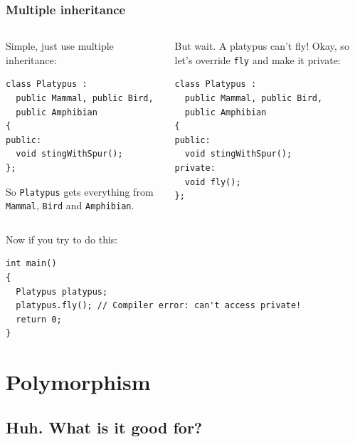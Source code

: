 \documentclass{beamer}
\begin{document}
\begin{frame}[fragile]
  \frametitle{Multiple inheritance}
  
  \begin{columns}[t]
    \begin{column}[T]{0.49\linewidth}
  		Simple, just use multiple inheritance:
  		\begin{lstlisting}
class Platypus :
  public Mammal, public Bird,
  public Amphibian
{
public:
  void stingWithSpur();
};
  		\end{lstlisting}
  		So \texttt{Platypus} gets everything from \texttt{Mammal}, \texttt{Bird} and \texttt{Amphibian}.
  	\end{column}
  	\pause
  	\begin{column}[T]{0.49\linewidth}
	  	But wait.  A platypus can't fly! \pause{}  Okay, so let's override \texttt{fly} and make it private:
		  \begin{lstlisting}
class Platypus :
  public Mammal, public Bird,
  public Amphibian
{
public:
  void stingWithSpur();
private:
  void fly();
};
  		\end{lstlisting}  
  	\end{column}
  \end{columns}
  \pause
  		Now if you try to do this:
  		\begin{lstlisting}[belowskip=0pt]
int main()
{
  Platypus platypus;
  platypus.fly(); // Compiler error: can't access private!
  return 0;
}
  		\end{lstlisting}
  

\end{frame}

\section{Polymorphism}

\subsection{Huh.  What is it good for?}
\end{document}
